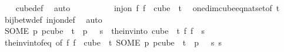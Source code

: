 \begin{isabellebody}
\ {\isacharasterisk}{\kern0pt}\ \isamarkupfalse%
\ cube{\isacharunderscore}{\kern0pt}def\ \isamarkupfalse%
\ auto\ \ \isanewline
\ \ \isacommand{{\isacharbraceright}{\kern0pt}}\isamarkupfalse%
\isanewline
\ \ \isamarkupfalse%
\ \isamarkupfalse%
\ {\isachardoublequoteopen}inj{\isacharunderscore}{\kern0pt}on\ {\isacharparenleft}{\kern0pt}{\isasymlambda}f{\isachardot}{\kern0pt}\ f\ {}{\isacharparenright}{\kern0pt}\ {\isacharparenleft}{\kern0pt}cube\ {}\ t{\isacharparenright}{\kern0pt}{\isachardoublequoteclose}\ \isamarkupfalse%
\ one{\isacharunderscore}{\kern0pt}dim{\isacharunderscore}{\kern0pt}cube{\isacharunderscore}{\kern0pt}eq{\isacharunderscore}{\kern0pt}nat{\isacharunderscore}{\kern0pt}set{\isacharbrackleft}{\kern0pt}of\ t{\isacharbrackright}{\kern0pt}\ \isamarkupfalse%
\ bij{\isacharunderscore}{\kern0pt}betw{\isacharunderscore}{\kern0pt}def\ inj{\isacharunderscore}{\kern0pt}on{\isacharunderscore}{\kern0pt}def\ \isamarkupfalse%
\ auto\ \isanewline
\ \ \isamarkupfalse%
\ \isamarkupfalse%
\ {\isachardoublequoteopen}{\isacharparenleft}{\kern0pt}SOME\ p{\isachardot}{\kern0pt}\ p{\isasymin}cube\ {}\ {\isacharparenleft}{\kern0pt}t{\isacharplus}{\kern0pt}{}{\isacharparenright}{\kern0pt}\ {\isasymand}\ p\ {}\ {\isacharequal}{\kern0pt}\ s{\isacharparenright}{\kern0pt}\ {\isacharequal}{\kern0pt}\ {\isacharparenleft}{\kern0pt}the{\isacharunderscore}{\kern0pt}inv{\isacharunderscore}{\kern0pt}into\ {\isacharparenleft}{\kern0pt}cube\ {}\ t{\isacharparenright}{\kern0pt}\ {\isacharparenleft}{\kern0pt}{\isasymlambda}f{\isachardot}{\kern0pt}\ f\ {}{\isacharparenright}{\kern0pt}\ s{\isacharparenright}{\kern0pt}{\isachardoublequoteclose}\ \isamarkupfalse%
\ the{\isacharunderscore}{\kern0pt}inv{\isacharunderscore}{\kern0pt}into{\isacharunderscore}{\kern0pt}f{\isacharunderscore}{\kern0pt}eq\ {\isacharbrackleft}{\kern0pt}of\ {\isachardoublequoteopen}{\isasymlambda}f{\isachardot}{\kern0pt}\ f\ {}{\isachardoublequoteclose}\ {\isachardoublequoteopen}cube\ {}\ t{\isachardoublequoteclose}\ {\isachardoublequoteopen}{\isacharparenleft}{\kern0pt}SOME\ p{\isachardot}{\kern0pt}\ p{\isasymin}cube\ {}\ {\isacharparenleft}{\kern0pt}t{\isacharplus}{\kern0pt}{}{\isacharparenright}{\kern0pt}\ {\isasymand}\ p\ {}\ {\isacharequal}{\kern0pt}\ s{\isacharparenright}{\kern0pt}{\isachardoublequoteclose}\ s{\isacharbrackright}{\kern0pt}\ \isamarkupfalse%

\end{isabellebody}

